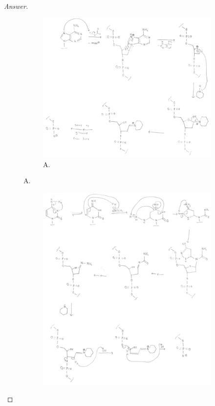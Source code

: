 \documentclass[../psets.tex]{subfiles}
\begin{document}
\begin{enumerate}
\begin{proof}[Answer]
\begin{figure}[H]
\begin{subfigure}[b]{\linewidth}
                \centering
                \includegraphics[width=\linewidth]{../ExtFiles/pset3-mechanismA.png}
                \caption{A.}
                \label{fig:pset3-mechanismA}
            \end{subfigure}
        \end{figure}
        \begin{figure}[H]
            \ContinuedFloat
            \centering
            \begin{subfigure}[b]{\linewidth}
                \centering
                \includegraphics[width=\linewidth]{../ExtFiles/pset3-mechanismC.png}

\end{subfigure}
\end{figure}
\end{proof}
\end{enumerate}
\end{document}

